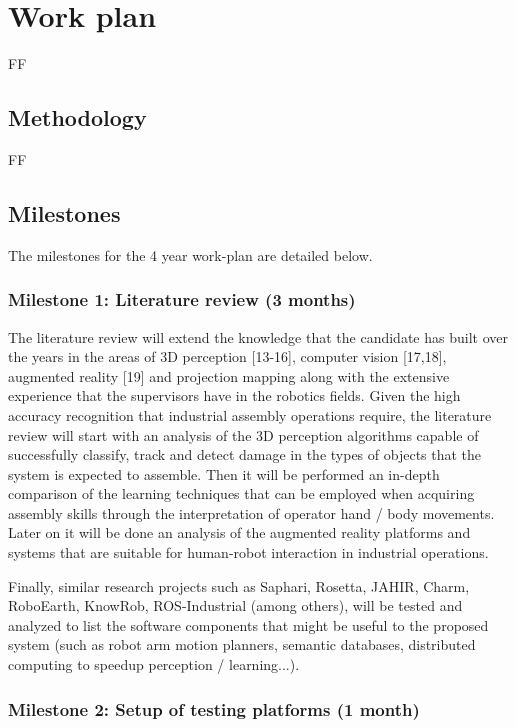 \chapter{Work plan}\label{chap:work-plan}

FF


\section{Methodology}

FF


\section{Milestones}

The milestones for the 4 year work-plan are detailed below.


\subsection{Milestone 1: Literature review (3 months)}

The literature review will extend the knowledge that the candidate has built over the years in the areas of 3D perception [13-16], computer vision [17,18], augmented reality [19] and projection mapping along with the extensive experience that the supervisors have in the robotics fields.
Given the high accuracy recognition that industrial assembly operations require, the literature review will start with an analysis of the 3D perception algorithms capable of successfully classify, track and detect damage in the types of objects that the system is expected to assemble. Then it will be performed an in-depth comparison of the learning techniques that can be employed when acquiring assembly skills through the interpretation of operator hand / body movements. Later on it will be done an analysis of the augmented reality platforms and systems that are suitable for human-robot interaction in industrial operations.

Finally, similar research projects such as Saphari, Rosetta, JAHIR, Charm, RoboEarth, KnowRob, ROS-Industrial (among others), will be tested and analyzed to list the software components that might be useful to the proposed system (such as robot arm motion planners, semantic databases, distributed computing to speedup perception / learning...).


\subsection{Milestone 2: Setup of testing platforms (1 month)}

